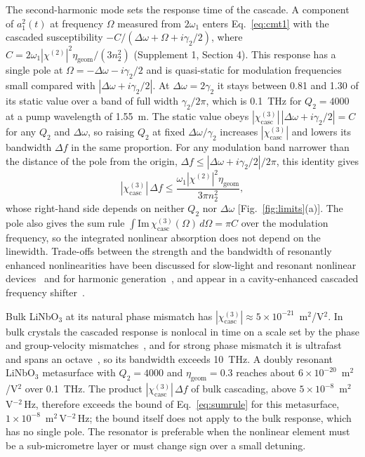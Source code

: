 \documentclass{optica-article}
\newcommand{\chitwo}{\chi^{(2)}}
\newcommand{\chicasc}{\chi^{(3)}_{\mathrm{casc}}}
\newcommand{\Dom}{\Delta\omega}
\newcommand{\etag}{\eta_{\mathrm{geom}}}
\begin{document}
The second-harmonic mode sets the response time of the cascade.  A
component of $a_1^2(t)$ at frequency $\Omega$ measured from $2\omega_1$ enters
Eq.~\eqref{eq:cmt1} with the cascaded susceptibility
$-C/(\Dom+\Omega+i\gamma_2/2)$, where
$C=2\omega_1|\chitwo|^2\etag/(3n_2^2)$ (Supplement 1, Section 4).  This
response has a single pole at $\Omega=-\Dom-i\gamma_2/2$ and is
quasi-static for modulation frequencies small compared with
$|\Dom+i\gamma_2/2|$.  At $\Dom=2\gamma_2$ it stays between 0.81 and 1.30 of
its static value over a band of full width $\gamma_2/2\pi$, which is 0.1~THz for
$Q_2=4000$ at a pump wavelength of 1.55~\textmu m.  The static value obeys
$|\chicasc|\,|\Dom+i\gamma_2/2|=C$ for any $Q_2$ and $\Dom$, so raising $Q_2$
at fixed $\Dom/\gamma_2$ increases $|\chicasc|$ and lowers its bandwidth
$\Delta f$ in the same proportion.  For any modulation band narrower than
the distance of the pole from the origin,
$\Delta f\le|\Dom+i\gamma_2/2|/2\pi$, this identity gives
\begin{equation}
  |\chicasc|\,\Delta f\le\frac{\omega_1|\chitwo|^2\etag}{3\pi n_2^2},
  \label{eq:sumrule}
\end{equation}
whose right-hand side depends on neither $Q_2$ nor $\Dom$
[Fig.~\ref{fig:limits}(a)].  The pole also gives the sum rule
$\int\mathrm{Im}\,\chicasc(\Omega)\,d\Omega=\pi C$ over the modulation
frequency, so the integrated nonlinear absorption does not depend on the
linewidth.  Trade-offs between the
strength and the bandwidth of resonantly enhanced nonlinearities have been
discussed for slow-light and resonant nonlinear
devices~\cite{khurgin2005,khurgin2010,khurgin2023} and for harmonic
generation~\cite{shcherbakov2019}, and appear in a cavity-enhanced cascaded
frequency shifter~\cite{gorbounova1996}.

Bulk LiNbO$_3$ at its natural phase mismatch has
$|\chicasc|\approx5\times10^{-21}$~m$^2$/V$^2$.  In bulk crystals the cascaded
response is nonlocal in time on a scale set by the phase and
group-velocity mismatches~\cite{bache2007ol}, and for strong phase
mismatch it is ultrafast and spans an octave~\cite{zhou2012}, so its
bandwidth exceeds 10~THz.  A doubly resonant LiNbO$_3$ metasurface with
$Q_2=4000$ and $\etag=0.3$ reaches about $6\times10^{-20}$~m$^2$/V$^2$
over 0.1~THz.  The product $|\chicasc|\,\Delta f$ of bulk cascading, above
$5\times10^{-8}$~m$^2\,$V$^{-2}\,$Hz, therefore exceeds the bound of
Eq.~\eqref{eq:sumrule} for this metasurface,
$1\times10^{-8}$~m$^2\,$V$^{-2}\,$Hz; the bound itself does not apply to
the bulk response, which has no single pole.  The resonator is preferable
when the nonlinear element must be a sub-micrometre layer or must change
sign over a small detuning.
\end{document}
